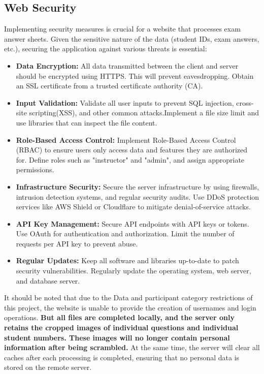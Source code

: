 \documentclass[twocolumn]{article}
\begin{document}
    \subsection{Web Security}
    Implementing security measures is crucial for a website that processes exam answer sheets. Given the sensitive nature of the data (student IDs, exam answers, etc.), securing the application against various threats is essential: 
    \begin{itemize}
        \item \textbf{Data Encryption:} All data transmitted between the client and server should be encrypted using HTTPS. This will prevent eavesdropping. Obtain an SSL certificate from a trusted certificate authority (CA).
        \item \textbf{Input Validation:} Validate all user inputs to prevent SQL injection, cross-site scripting(XSS), and other common attacks.Implement a file size limit and use libraries that can inspect the file content.
        \item \textbf{Role-Based Access Control:} Implement Role-Based Access Control (RBAC) to ensure users only access data and features they are authorized for. Define roles such as "instructor" and "admin", and assign appropriate permissions.
        \item \textbf{Infrastructure Security:} Secure the server infrastructure by using firewalls, intrusion detection systems, and regular security audits. Use DDoS protection services like AWS Shield or Cloudflare to mitigate denial-of-service attacks.
        \item \textbf{API Key Management:} Secure API endpoints with API keys or tokens. Use OAuth for authentication and authorization. Limit the number of requests per API key to prevent abuse.
        \item \textbf{Regular Updates:} Keep all software and libraries up-to-date to patch security vulnerabilities. Regularly update the operating system, web server, and database server.
        \end{itemize}
        It should be noted that due to the Data and participant category restrictions of this project, the website is unable to provide the creation of usernames and login operations. \textbf{But all files are completed locally, and the server only retains the cropped images of individual questions and individual student numbers. These images will no longer contain personal information after being scrambled.} At the same time, the server will clear all caches after each processing is completed, ensuring that no personal data is stored on the remote server.
\end{document}
